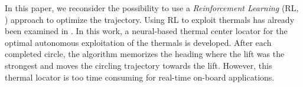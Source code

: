 \documentclass[a4paper, 10pt, conference]{ieeeconf}
\begin{document}


In this paper, we reconsider the possibility to use a \emph{Reinforcement Learning} (RL, \cite{sutton_book}) approach to optimize the trajectory. Using RL to exploit thermals has already been examined in \cite{wharington_phd}. In this work, a neural-based thermal center locator for the optimal autonomous exploitation of the thermals is developed. After each completed circle, the algorithm memorizes the heading where the lift was the strongest and moves the circling trajectory towards the lift. However, this thermal locator is too time consuming for real-time on-board applications.
\end{document}
